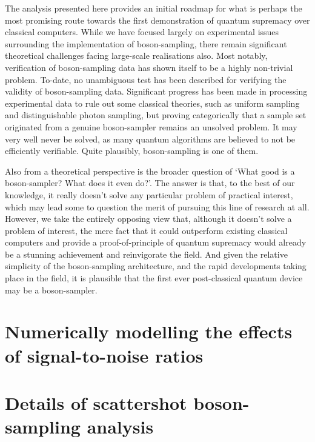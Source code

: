 \documentclass[aps,rmp,twocolumn,amsmath,amssymb,nofootinbib,superscriptaddress]{revtex4}
\begin{document}
The analysis presented here provides an initial roadmap for what is perhaps the most promising route towards the first demonstration of quantum supremacy over classical computers. While we have focused largely on experimental issues surrounding the implementation of boson-sampling, there remain significant theoretical challenges facing large-scale realisations also. Most notably, verification of boson-sampling data has shown itself to be a highly non-trivial problem. To-date, no unambiguous test has been described for verifying the validity of boson-sampling data. Significant progress has been made in processing experimental data to rule out some classical theories, such as uniform sampling and distinguishable photon sampling, but proving categorically that a sample set originated from a genuine boson-sampler remains an unsolved problem. It may very well never be solved, as many quantum algorithms are believed to not be efficiently verifiable. Quite plausibly, boson-sampling is one of them.

Also from a theoretical perspective is the broader question of `What good is a boson-sampler? What does it even do?'. The answer is that, to the best of our knowledge, it really doesn't solve any particular problem of practical interest, which may lead some to question the merit of pursuing this line of research at all. However, we take the entirely opposing view that, although it doesn't solve a problem of interest, the mere fact that it could outperform existing classical computers and provide a proof-of-principle of quantum supremacy would already be a stunning achievement and reinvigorate the field. And given the relative simplicity of the boson-sampling architecture, and the rapid developments taking place in the field, it is plausible that the first ever post-classical quantum device may be a boson-sampler.

%
%

\begin{acknowledgments}
\end{acknowledgments}

\appendix

\section{Numerically modelling the effects of signal-to-noise ratios}

\section{Details of scattershot boson-sampling analysis}

%
%


\end{document}
